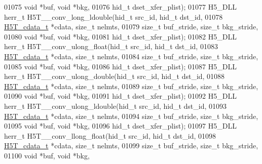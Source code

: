 \begin{DoxyCode}
01075                                      \textcolor{keywordtype}{void} *buf, \textcolor{keywordtype}{void} *bkg,
01076                                      hid\_t dset\_xfer\_plist);
01077 H5\_DLL herr\_t H5T\_\_conv\_long\_ldouble(hid\_t src\_id, hid\_t dst\_id,
01078                      \hyperlink{struct_h5_t__cdata__t}{H5T\_cdata\_t} *cdata, \textcolor{keywordtype}{size\_t} nelmts,
01079                      \textcolor{keywordtype}{size\_t} buf\_stride, \textcolor{keywordtype}{size\_t} bkg\_stride,
01080                                      \textcolor{keywordtype}{void} *buf, \textcolor{keywordtype}{void} *bkg,
01081                                      hid\_t dset\_xfer\_plist);
01082 H5\_DLL herr\_t H5T\_\_conv\_ulong\_float(hid\_t src\_id, hid\_t dst\_id,
01083                      \hyperlink{struct_h5_t__cdata__t}{H5T\_cdata\_t} *cdata, \textcolor{keywordtype}{size\_t} nelmts,
01084                      \textcolor{keywordtype}{size\_t} buf\_stride, \textcolor{keywordtype}{size\_t} bkg\_stride,
01085                                      \textcolor{keywordtype}{void} *buf, \textcolor{keywordtype}{void} *bkg,
01086                                      hid\_t dset\_xfer\_plist);
01087 H5\_DLL herr\_t H5T\_\_conv\_ulong\_double(hid\_t src\_id, hid\_t dst\_id,
01088                      \hyperlink{struct_h5_t__cdata__t}{H5T\_cdata\_t} *cdata, \textcolor{keywordtype}{size\_t} nelmts,
01089                      \textcolor{keywordtype}{size\_t} buf\_stride, \textcolor{keywordtype}{size\_t} bkg\_stride,
01090                                      \textcolor{keywordtype}{void} *buf, \textcolor{keywordtype}{void} *bkg,
01091                                      hid\_t dset\_xfer\_plist);
01092 H5\_DLL herr\_t H5T\_\_conv\_ulong\_ldouble(hid\_t src\_id, hid\_t dst\_id,
01093                      \hyperlink{struct_h5_t__cdata__t}{H5T\_cdata\_t} *cdata, \textcolor{keywordtype}{size\_t} nelmts,
01094                      \textcolor{keywordtype}{size\_t} buf\_stride, \textcolor{keywordtype}{size\_t} bkg\_stride,
01095                                      \textcolor{keywordtype}{void} *buf, \textcolor{keywordtype}{void} *bkg,
01096                                      hid\_t dset\_xfer\_plist);
01097 H5\_DLL herr\_t H5T\_\_conv\_llong\_float(hid\_t src\_id, hid\_t dst\_id,
01098                      \hyperlink{struct_h5_t__cdata__t}{H5T\_cdata\_t} *cdata, \textcolor{keywordtype}{size\_t} nelmts,
01099                      \textcolor{keywordtype}{size\_t} buf\_stride, \textcolor{keywordtype}{size\_t} bkg\_stride,
01100                                      \textcolor{keywordtype}{void} *buf, \textcolor{keywordtype}{void} *bkg,

\end{DoxyCode}
